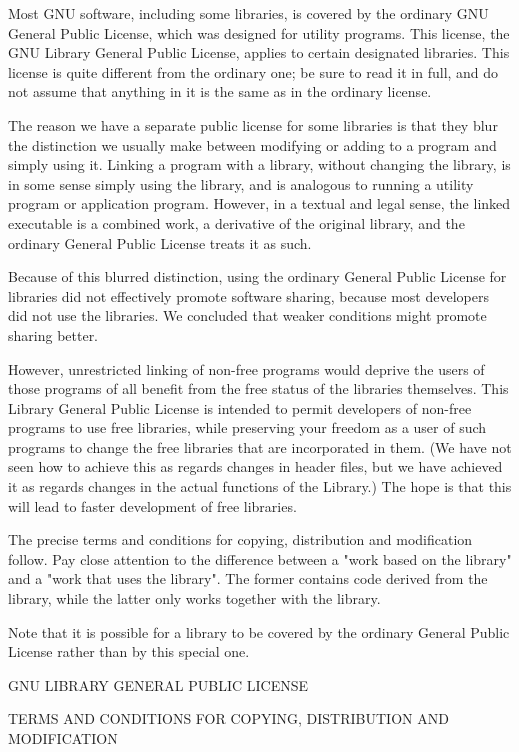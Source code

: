 \documentclass[twoside]{tceusermanual}
\begin{document}
Most GNU software, including some libraries, is covered by the
ordinary GNU General Public License, which was designed for
utility programs.  This license, the GNU Library General Public
License, applies to certain designated libraries.  This license
is quite different from the ordinary one; be sure to read it in
full, and do not assume that anything in it is the same as in the
ordinary license.

The reason we have a separate public license for some libraries
is that they blur the distinction we usually make between
modifying or adding to a program and simply using it.  Linking a
program with a library, without changing the library, is in some
sense simply using the library, and is analogous to running a
utility program or application program.  However, in a textual
and legal sense, the linked executable is a combined work, a
derivative of the original library, and the ordinary General
Public License treats it as such.

Because of this blurred distinction, using the ordinary General
Public License for libraries did not effectively promote
software sharing, because most developers did not use the
libraries.  We concluded that weaker conditions might promote
sharing better.

However, unrestricted linking of non-free programs would deprive
the users of those programs of all benefit from the free status
of the libraries themselves.  This Library General Public
License is intended to permit developers of non-free programs to
use free libraries, while preserving your freedom as a user of
such programs to change the free libraries that are incorporated
in them.  (We have not seen how to achieve this as regards
changes in header files, but we have achieved it as regards
changes in the actual functions of the Library.)  The hope is
that this will lead to faster development of free libraries.

The precise terms and conditions for copying, distribution and
modification follow.  Pay close attention to the difference
between a "work based on the library" and a "work that uses the
library".  The former contains code derived from the library,
while the latter only works together with the library.

Note that it is possible for a library to be covered by the
ordinary General Public License rather than by this special one.

\begin{center}
                GNU LIBRARY GENERAL PUBLIC LICENSE

 TERMS AND CONDITIONS FOR COPYING, DISTRIBUTION AND MODIFICATION
\end{center}
\end{document}
